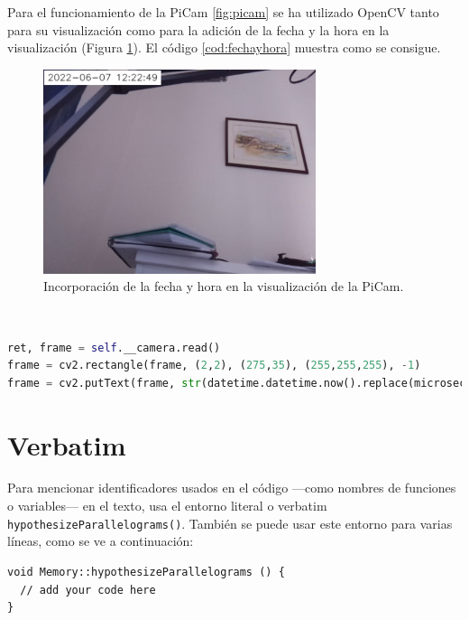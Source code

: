 Para el funcionamiento de la PiCam \ref{fig:picam} se ha utilizado OpenCV tanto para su visualización como para la adición de la fecha y la hora en la visualización (Figura \ref{fig:fechayhora}). El código \ref{cod:fechayhora} muestra como se consigue.
\begin{figure} [h!]
  \begin{center}
    \includegraphics[width=8cm]{figs/fechayhora}
  \end{center}
  \caption{Incorporación de la fecha y hora en la visualización de la PiCam.}
  \label{fig:fechayhora}
\end{figure}\\

\begin{code}[h]
\begin{lstlisting}[language=Python]
ret, frame = self.__camera.read()
frame = cv2.rectangle(frame, (2,2), (275,35), (255,255,255), -1)
frame = cv2.putText(frame, str(datetime.datetime.now().replace(microsecond=0)), (10,25), cv2.FONT_HERSEY_SIMPLEX, 0.7, (0,0,0), 1, cv2.LINE_AA))
\end{lstlisting}
\caption[Código para crear un rectángulo y escribir la fecha actual sobre el.]{Código para crear un rectángulo y escribir la fecha actual sobre el.}
\label{cod:fechayhora}
\end{code}

\section{Verbatim}

Para mencionar identificadores usados en el código ---como nombres de funciones o variables--- en el texto, usa el entorno literal o verbatim \verb|hypothesizeParallelograms()|. También se puede usar este entorno para varias líneas, como se ve a continuación:

\begin{verbatim}
void Memory::hypothesizeParallelograms () {
  // add your code here
}
\end{verbatim}


